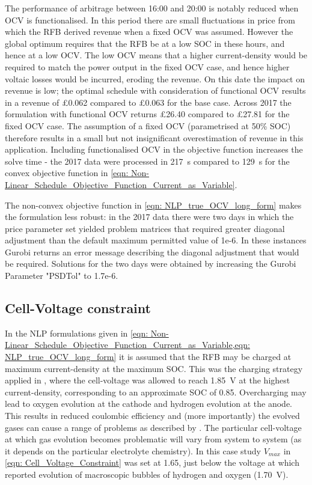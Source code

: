 \documentclass[preprint,3p,review,authoryear,10pt]{elsarticle}
\begin{document}
The performance of arbitrage between 16:00 and 20:00 is notably reduced when OCV is functionalised. In this period there are small fluctuations in price from which the RFB derived revenue when a fixed OCV was assumed. However the global optimum requires that the RFB be at a low SOC in these hours, and hence at a low OCV. The low OCV means that a higher current-density would be required to match the power output in the fixed OCV case, and hence higher voltaic losses would be incurred, eroding the revenue. On this date the impact on revenue is low; the optimal schedule with consideration of functional OCV results in a revenue of \pounds 0.062 compared to \pounds 0.063 for the base case. Across 2017 the formulation with functional OCV returns \pounds 26.40 compared to \pounds 27.81 for the fixed OCV case. The assumption of a fixed OCV (parametrised at 50\% SOC) therefore results in a small but not insignificant overestimation of revenue in this application. Including functionalised OCV in the objective function increases the solve time - the 2017 data were processed in \SI{217}{\second} compared to \SI{129}{\second} for the convex objective function in \cref{eqn: Non-Linear_Schedule_Objective_Function_Current_as_Variable}. 

The non-convex objective function in \cref{eqn: NLP_true_OCV_long_form} makes the formulation less robust: in the 2017 data there were two days in which the price parameter set yielded problem matrices that required greater diagonal adjustment than the default maximum permitted value of 1e-6. In these instances Gurobi returns an error message describing the diagonal adjustment that would be required. Solutions for the two days were obtained by increasing the Gurobi Parameter "PSDTol" to 1.7e-6.

\subsection{Cell-Voltage constraint}
\label{Results_Cell_Voltage_Constraint}
In the NLP formulations given in \cref{eqn: Non-Linear_Schedule_Objective_Function_Current_as_Variable,eqn: NLP_true_OCV_long_form} it is assumed that the RFB may be charged at maximum current-density at the maximum SOC. This was the charging strategy applied in \cite{Reed2016}, where the cell-voltage was allowed to reach \SI{1.85}{\volt} at the highest current-density, corresponding to an approximate SOC of 0.85. Overcharging may lead to oxygen evolution at the cathode and hydrogen evolution at the anode. This results in reduced coulombic efficiency and  (more importantly) the evolved gases can cause a range of problems as described by \cite{Kear2012}.  The particular cell-voltage at which gas evolution becomes problematic will vary from system to system (as it depends on the particular electrolyte chemistry). In this case study $V_{max}$ in \cref{eqn: Cell_Voltage_Constraint} was set at 1.65, just below the voltage at which \cite{Wei2017} reported evolution of macroscopic bubbles of hydrogen and oxygen (\SI{1.70}{\volt}). 
\end{document}
